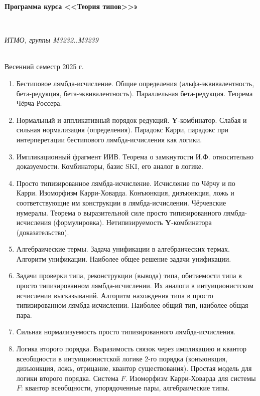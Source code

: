 \documentclass[11pt,a4paper,oneside]{article}
\begin{document}
\begin{center}
\begin{Large}{\bfseries Программа курса <<Теория типов>>э}\end{Large}\\
\vspace{1mm}
\begin{small} \itshape ИТМО, группы M3232..M3239\end{small}\\
\small Весенний семестр 2025 г.
\end{center}

\begin{enumerate}
\item Бестиповое лямбда-исчисление. Общие определения (альфа-эквивалентность, бета-редукция, бета-эквивалентность).
Параллельная бета-редукция. Теорема Чёрча-Россера.
\item Нормальный и аппликативный порядок редукций. \textbf{Y}-комбинатор. Слабая и сильная нормализация (определения).
Парадокс Карри, парадокс при интерперетации бестипового лямбда-исчисления как логики.
\item Импликационный фрагмент ИИВ. Теорема о замкнутости И.Ф. относительно доказуемости.
Комбинаторы, базис SKI, его аналог в логике.
\item Просто типизированное лямбда-исчисление. Исчисление по Чёрчу и по Карри. Изоморфизм Карри-Ховарда.
Конъюнкция, дизъюнкция, ложь и соответствующие им конструкции в лямбда-исчислении. 
Чёрчевские нумералы. Теорема о выразительной силе просто типизированного лямбда-исчисления (формулировка).
Нетипизируемость \textbf{Y}-комбинатора (доказательство).
\item Алгебраические термы. Задача унификации в алгебраических термах. Алгоритм унификации. Наиболее общее решение задачи унификации.
\item Задачи проверки типа, реконструкции (вывода) типа, обитаемости типа в просто типизированном лямбда-исчислении.
Их аналоги в интуиционистском исчислении высказываний. 
Алгоритм нахождения типа в просто типизированном лямбда-исчислении. Наиболее общий тип, наиболее общая пара.
\item Сильная нормализуемость просто типизированного лямбда-исчисления.
\item Логика второго порядка. Выразимость связок через импликацию и квантор всеобщности в интуиционистской логике 
2-го порядка (конъюнкция, дизъюнкция, ложь, отрицание, квантор существования). Простая модель для логики второго порядка.
Система $F$. Изоморфизм Карри-Ховарда для системы $F$: квантор всеобщности, упорядоченные пары, алгебраические типы.

\end{enumerate}
\end{document}
